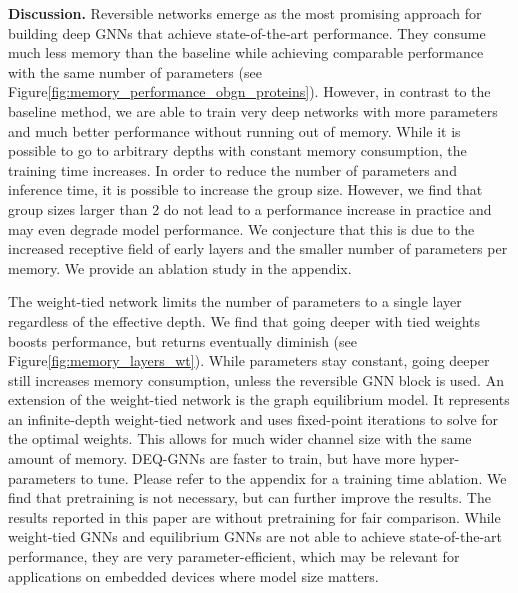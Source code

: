 \documentclass{article}
\newcommand{\figLabel}{Figure\xspace}
\newcommand{\mysection}[1]{\vspace{0pt}\noindent\textbf{#1.}}
\begin{document}
\mysection{Discussion}
Reversible networks emerge as the most promising approach for building deep GNNs that achieve state-of-the-art performance. They consume much less memory than the baseline while achieving comparable performance with the same number of parameters (see \figLabel \ref{fig:memory_performance_obgn_proteins}). However, in contrast to the baseline method, we are able to train very deep networks with more parameters and much better performance without running out of memory. While it is possible to go to arbitrary depths with constant memory consumption, the training time increases. In order to reduce the number of parameters and inference time, it is possible to increase the group size. However, we find that group sizes larger than 2 do not lead to a performance increase in practice and may even degrade model performance. We conjecture that this is due to the increased receptive field of early layers and the smaller number of parameters per memory. We provide an ablation study in the appendix.

The weight-tied network limits the number of parameters to a single layer regardless of the effective depth. We find that going deeper with tied weights boosts performance, but returns eventually diminish (see \figLabel \ref{fig:memory_layers_wt}). While parameters stay constant, going deeper still increases memory consumption, unless the reversible GNN block is used. 
An extension of the weight-tied network is the graph equilibrium model. It represents an infinite-depth weight-tied network and uses fixed-point iterations to solve for the optimal weights. This allows for much wider channel size with the same amount of memory. DEQ-GNNs are faster to train, but have more hyper-parameters to tune. Please refer to the appendix for a training time ablation. We find that pretraining is not necessary, but can further improve the results. The results reported in this paper are without pretraining for fair comparison. While weight-tied GNNs and equilibrium GNNs are not able to achieve state-of-the-art performance, they are very parameter-efficient, which may be relevant for applications on embedded devices where model size matters. 
\end{document}
